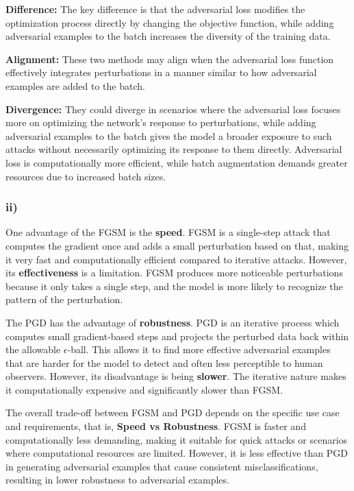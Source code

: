 \documentclass{article}
\begin{document}
\textbf{Difference:} The key difference is that the adversarial loss modifies the optimization process directly by changing the objective function, while adding adversarial examples to the batch increases the diversity of the training data.

\textbf{Alignment:} These two methods may align when the adversarial loss function effectively integrates perturbations in a manner similar to how adversarial examples are added to the batch. 

\textbf{Divergence:} They could diverge in scenarios where the adversarial loss focuses more on optimizing the network's response to perturbations, while adding adversarial examples to the batch gives the model a broader exposure to such attacks without necessarily optimizing its response to them directly. Adversarial loss is computationally more efficient, while batch augmentation demands greater resources due to increased batch sizes.

\subsubsection*{ii)}

One advantage of the FGSM is the \textbf{speed}. FGSM is a single-step attack that computes the gradient once and adds a small perturbation based on that, making it very fast and computationally efficient compared to iterative attacks. However, its \textbf{effectiveness} is a limitation. FGSM produces more noticeable perturbations because it only takes a single step, and the model is more likely to recognize the pattern of the perturbation.

The PGD has the advantage of \textbf{robustness}. PGD is an iterative process which computes small gradient-based steps and projects the perturbed data back within the allowable $\epsilon$-ball. This allows it to find more effective adversarial examples that are harder for the model to detect and often less perceptible to human observers. However, its disadvantage is being \textbf{slower}. The iterative nature makes it computationally expensive and significantly slower than FGSM.

The overall trade-off between FGSM and PGD depends on the specific use case and requirements, that is, \textbf{Speed vs Robustness}. FGSM is faster and computationally less demanding, making it suitable for quick attacks or scenarios where computational resources are limited. However, it is less effective than PGD in generating adversarial examples that cause consistent misclassifications, resulting in lower robustness to adversarial examples.
\end{document}
